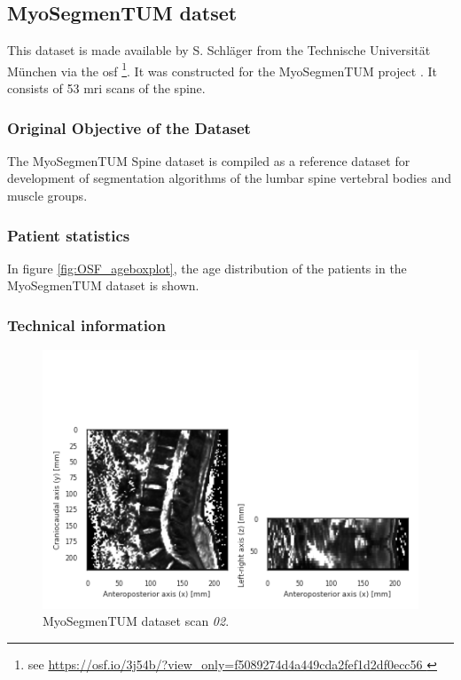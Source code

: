 \subsection{MyoSegmenTUM datset}

This dataset is made available by S. Schläger from the Technische Universität München via the \acrfull{osf} \footnote{see \url{ https://osf.io/3j54b/?view_only=f5089274d4a449cda2fef1d2df0ecc56 }}.
It was constructed for the MyoSegmenTUM project \cite{Durian2019}.
It consists of 53 \acrshort{mri} scans of the spine.

\subsubsection{Original Objective of the Dataset}

The MyoSegmenTUM Spine dataset is compiled as a reference dataset for development of segmentation algorithms of the lumbar spine vertebral bodies and  muscle groups.

\subsubsection{Patient statistics}

In figure \ref{fig:OSF_ageboxplot}, the age distribution of the patients in the MyoSegmenTUM dataset is shown.




\subsubsection{Technical information}

\begin{figure}
    \centering
    \includegraphics[width=.95\textwidth]{automated_graphs/OSF_02.png}
    \caption{MyoSegmenTUM dataset scan \textit{02}. \label{fig:OSF_02}}
\end{figure}